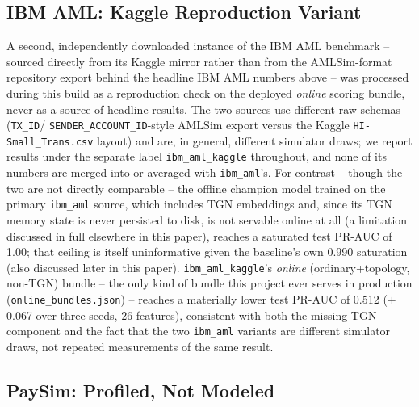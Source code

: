 \subsection{IBM AML: Kaggle Reproduction Variant}

A second, independently downloaded instance of the IBM AML benchmark --
sourced directly from its Kaggle mirror rather than from the AMLSim-format
repository export behind the headline IBM AML numbers above -- was
processed during this build as a reproduction check on the deployed
\emph{online} scoring bundle, never as a source of headline results. The
two sources use different raw schemas (\texttt{TX\_ID}/
\texttt{SENDER\_ACCOUNT\_ID}-style AMLSim export versus the Kaggle
\texttt{HI-Small\_Trans.csv} layout) and are, in general, different
simulator draws; we report results under the separate label
\texttt{ibm\_aml\_kaggle} throughout, and none of its numbers are merged
into or averaged with \texttt{ibm\_aml}'s. For contrast -- though the two
are not directly comparable -- the offline champion model trained on the
primary \texttt{ibm\_aml} source, which includes TGN embeddings and, since
its TGN memory state is never persisted to disk, is not servable online at
all (a limitation discussed in full elsewhere in this paper), reaches a
saturated test PR-AUC of 1.00; that ceiling is itself uninformative given
the baseline's own 0.990 saturation (also discussed later in this paper).
\texttt{ibm\_aml\_kaggle}'s \emph{online} (ordinary+topology, non-TGN)
bundle -- the only kind of bundle this project ever serves in production
(\texttt{online\_bundles.json}) -- reaches a materially lower test PR-AUC
of 0.512 ($\pm$0.067 over three seeds, 26 features), consistent with both
the missing TGN component and the fact that the two \texttt{ibm\_aml}
variants are different simulator draws, not repeated measurements of the
same result.

\subsection{PaySim: Profiled, Not Modeled}\label{sec:paysim}

